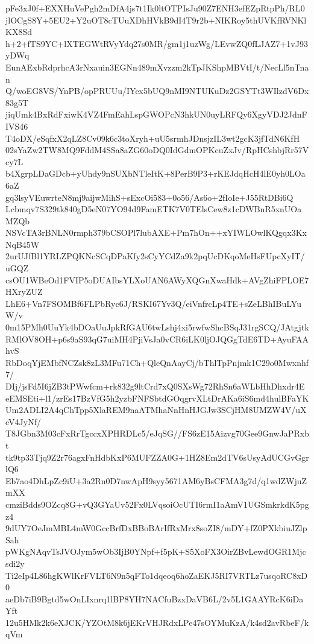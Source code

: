 pFe3xJ0f+EXXHuVePgh2mDfA4js7t1Ik0ltOTPIsJu90Z7ENH3efEZpRtpPh/RL0
jlOCgS8Y+5EU2+Y2uOT8cTUuXDhHVkB9dI4T9r2b+NIKRoy5thUVKfRVNKlKX8Sd
h+2+fTS9YC+lXTEGWtRVyYdq27s0MR/gm1j1uzWg/LEvwZQ0fLJAZ7+1vJ93yDWq
EunAExbRdprhcA3rNxauin3EGNn489mXvzzm2kTpJKShpMBVtI/t/NecLl5nTnan
Q/woEG8VS/YnPB/opPRUUu/IYex5bUQ9nMI9NTUKuDz2GSYTt3WIlzdV6Dx83g5T
jiqUmk4BxRdFxiwK4VZ4FmEahLspGWOPcN3hkUN0uyLRFQy6XgyVDJ2JdnFIVS46
T4oDX/eSqfxX2qLZ8Cv09k6c3toXryh+uU5srmhJDnsjzIL3wt2gcK3jfTdN6KfH
02sYaZw2TW8MQ9FddM4SSa8aZG60oDQ0IdGdmOPKcuZxJv/RpHCshbjRr57Vcy7L
b4XgrpLDaGDcb+yUhdy9nSUXbNTleItK+8PerB9P3+rKEJdqHcH4lE0yh0LOa6aZ
gq3lsyVEuwrteN8mj9aijwMihS+sExcOi583+0o56/As6o+2fIoIe+J55RtDBi6Q
Lcbmqv7S329tk840gD5eN07YO94d9FamETK7V0TElsCew8z1cDWBnR5xnUOaMZQb
NSVcTA3rBNLN0rmph379bCSOPl7lubAXE+Pm7hOn++xYIWLOwlKQgqx3KxNqB45W
2urUJfBl1YRLZPQKNcSCqDPaKfy2sCyYCdZa9k2pqUcDKqoMeHsFUpcXyIT/uGQZ
csOU1WBeOd1FVIP5oDUAIbsYLXoUAN6AWyXQGnXwaHdk+AVgZhiFPLOE7HXryZUZ
LhE6+Vn7FSOMBf6FLPbRyc6J/RSKI67Yv3Q/eiVnfrcLp4TE+sZeLBhIBuLYuW/v
0m15PMh0UuYk4bDOaUuJpkRfGAU6twLshj4xi5rwfwShcBSqJ31rgSCQ/JAtgjtk
RMlOV8OH+p6s9aS93qG7uiMH4PjiVsJa0vCR6iLK0ljOJQGgTdE6TD+AyuFAAhvS
RbDoqYjEMbfNCZsk8zL3MFu71Ch+QleQnAayCj/bThlTpPnjmk1C29o0Mwxnhf7/
DIj/jsFd5I6jZB3tPWwfcm+rk832g9ltCrd7xQ0SXsWg72RhSn6aWLbHhDhxdr4E
eEMSEti+l1/zrEs17BzVfG5h2yzbFNFSbtdGOqgrvXLtDrAKa6iS6md4hulBFaYK
Um2ADLI2A4qChTpp5XlaREM9naATMhaNnHnHJGJw3SCjHM8UMZW4V/uXeV4JyNf/
T8JGbn3M03cFxRrTgccxXPHRDLc5/eJqSG//FS6zE15Aizvg70Gee9GnwJaPRxbt
tk9tp33Tjq9Z2r76agxFnHdbKxP6MUFZZA0G+1HZ8Em2dTV6sUsyAdUCGvGgrlQ6
Eb7ao4DhLpZc9iU+3a2Rn0D7nwApH9syy5671AM6yBsCFMA3g7d/q1wdZWjuZmXX
cmziBdds9OZcq8G+vQ3GYaUv52Fx0LVqsoiOcUTI6rmI1aAmV1UGSmkrkdK5pgz4
9dUY7OeJmMBL4mW0GccBrfDxBBoBArIfRxMrx8soZI8/mDY+fZ0PXkbiuJZlpSah
pWKgNAqvTsJVOJym5wOb3IjB0YNpf+f5pK+S5XoFX3OirZBvLewdOGR1Mjcsdi2y
Ti2eIp4L86hgKWlKrFVLT6N9n5qFTo1dqeoq6hoZaEKJ5RI7VRTLz7usqoRC8xD0
aeDb7iB9Bgtd5wOnLIxnrq1lBP8YH7NACfuBzxDaVB6L/2v5L1GAAYRcK6iDaYft
12u5HMk2k6eXJCK/YZOtM8k6jEKrVHJRdxLPe47sOYMuKzA/k4sd2avRbeF/kqVm
